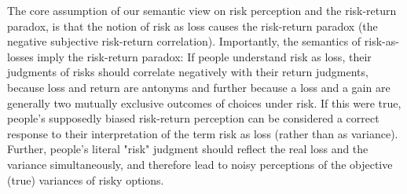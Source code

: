 \documentclass[a4paper,man, natbib,floatsintext]{apa6} %
\begin{document}
The core assumption of our semantic view on risk perception and the risk-return paradox, is that the notion of risk as loss causes the risk-return paradox (the negative subjective risk-return correlation). Importantly, the semantics of risk-as-losses imply the risk-return paradox: If people understand risk as loss, their judgments of risks should correlate negatively with their return judgments, because loss and return are antonyms and further because a loss and a gain are generally two mutually exclusive outcomes of choices under risk. If this were true, people's supposedly biased risk-return perception can be considered a correct response to their interpretation of the term risk as loss (rather than as variance).  Further, people's literal "risk" judgment should reflect the real loss and the variance simultaneously, and therefore lead to noisy perceptions of the objective (true) variances of risky options.


\end{document}
